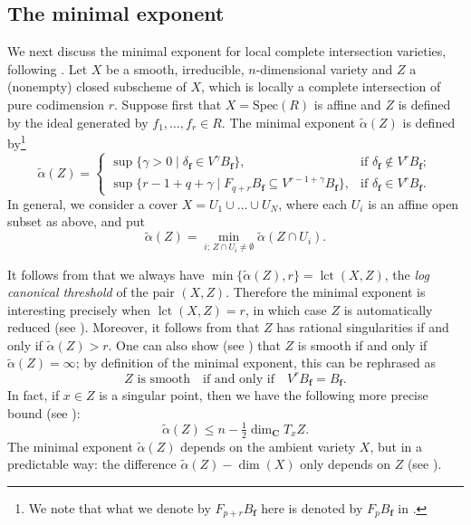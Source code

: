 \documentclass[JEP,XML,SOM,Unicode]{cedram}
\theoremstyle{plain}
\theoremstyle{definition}
\newcommand\C{{\mathbf C}}
\newcommand\bff{{\boldsymbol f}}
\DeclareMathOperator{\lct}{lct}
\begin{document}
\subsection{The minimal exponent}\label{section_min_exponent}
We next discuss the minimal exponent for local complete intersection varieties, following \cite{CDMO}. Let $X$ be a smooth,
irreducible, $n$-dimensional variety and $Z$ a (nonempty) closed subscheme of $X$, which is locally a complete intersection of pure codimension $r$. Suppose first
that $X=\mathrm{Spec}(R)$ is affine
and $Z$ is defined by the ideal generated by $f_1,\ldots,f_r\in R$. The minimal exponent $\widetilde{\alpha}(Z)$ is defined by\footnote{We note that what we
denote by $F_{p+r}B_{\bff}$ here is denoted by $F_pB_{\bff}$ in \cite{CDMO}.}
\begin{equation}\label{eq3_intro_v2}
\widetilde{\alpha}(Z)
=
\begin{cases}
\sup\{\gamma>0\mid \delta_\bff\in V^{\gamma}B_{\bff}\}, & \text{if}\,\,\delta_\bff\not\in V^rB_\bff; \\
\sup\{r-1+q+\gamma\mid F_{q+r}B_{\bff}\subseteq V^{r-1+\gamma}B_{\bff}\}, & \text{if}\,\,\delta_\bff\in V^rB_\bff.
\end{cases}
\end{equation}
In general, we consider a cover $X=U_1\cup\ldots\cup U_N$, where each $U_i$ is an affine open subset as above, and put
\[\widetilde{\alpha}(Z)=\min_{i;\,Z\cap U_i\neq\emptyset}\widetilde{\alpha}(Z\cap U_i).\]

It follows from \cite[Th.\,1]{BMS} that we always have $\min\big\{\widetilde{\alpha}(Z),r\big\}=\lct(X,Z)$, the \emph{log canonical threshold} of the pair $(X,Z)$. Therefore the minimal exponent is interesting
precisely when $\lct(X,Z)=r$, in which case $Z$ is automatically reduced (see \cite[Rem.\,4.2]{CDMO}). Moreover, it follows from \cite[Cor.\,1.7]{CDMO}
that $Z$ has rational singularities if and only if $\widetilde{\alpha}(Z)>r$. One can also show (see \cite[Rem.\,4.15]{CDMO}) that $Z$ is smooth if and only if $\widetilde{\alpha}(Z)=\infty$; by definition
of the minimal exponent, this can be rephrased as
\begin{equation}\label{eq_char_V_smooth}
Z\,\,\text{is smooth}\quad\text{if and only if}\quad V^rB_{\bff}=B_{\bff}.
\end{equation}
In fact,
if $x\in Z$ is a singular point, then we have the following more precise bound (see \cite[Rem.\,4.21]{CDMO}):
\begin{equation}\label{eq_bd_min_exp}
\widetilde{\alpha}(Z)\leq n-\tfrac{1}{2}\dim_{\C}T_xZ.
\end{equation}
The minimal exponent $\widetilde{\alpha}(Z)$ depends on the ambient variety $X$, but in a predictable way: the difference $\widetilde{\alpha}(Z)-\dim(X)$
only depends on $Z$ (see \cite[Prop.\,4.14]{CDMO}).
\end{document}
